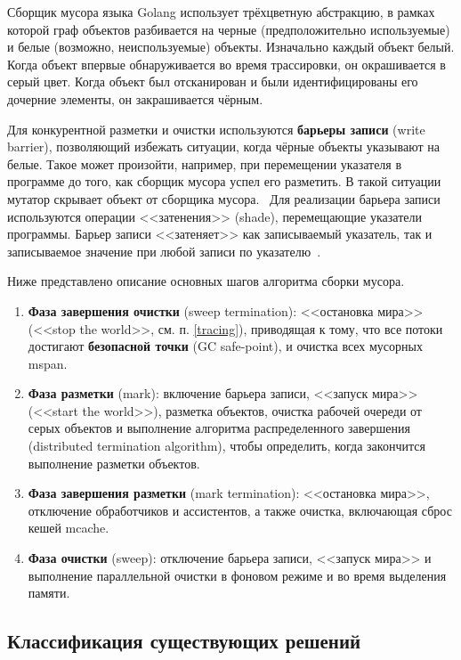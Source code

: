 Сборщик мусора языка Golang использует трёхцветную абстракцию, в рамках которой граф объектов разбивается на черные (предположительно используемые) и белые (возможно, неиспользуемые) объекты. Изначально каждый объект белый. Когда объект впервые обнаруживается во время трассировки, он окрашивается в серый цвет. Когда объект был отсканирован и были идентифицированы его дочерние элементы, он закрашивается чёрным.~\cite{handbook}

Для конкурентной разметки и очистки используются \textbf{барьеры записи} (write barrier), позволяющий избежать ситуации, когда чёрные объекты указывают на белые. Такое может произойти, например, при перемещении указателя в программе до того, как сборщик мусора успел его разметить. В такой ситуации мутатор скрывает объект от сборщика мусора.~\cite{golang_gc} Для реализации барьера записи используются операции <<затенения>> (shade), перемещающие указатели программы. Барьер записи <<затеняет>> как записываемый указатель, так и записываемое значение при любой записи по указателю~\cite{golang_barrier}. 

Ниже представлено описание основных шагов алгоритма сборки мусора.~\cite{golang_gc}

\begin{enumerate}[label*=\arabic*.]
	\item \textbf{Фаза завершения очистки} (sweep termination): <<остановка мира>> (<<stop the world>>, см. п. \ref{tracing}), приводящая к тому, что все потоки достигают \textbf{безопасной точки} (GC safe-point), и очистка всех мусорных mspan.
	\item \textbf{Фаза разметки} (mark): включение барьера записи, <<запуск мира>> (<<start the world>>), разметка объектов, очистка рабочей очереди от серых объектов и выполнение алгоритма распределенного завершения (distributed termination algorithm), чтобы определить, когда закончится выполнение разметки объектов.
	\item \textbf{Фаза завершения разметки} (mark termination): <<остановка мира>>, отключение обработчиков и ассистентов, а также очистка, включающая сброс кешей mcache.
	\item \textbf{Фаза очистки} (sweep): отключение барьера записи, <<запуск мира>> и выполнение параллельной очистки в фоновом режиме и во время выделения памяти.
\end{enumerate}

\subsection*{Классификация существующих решений}

